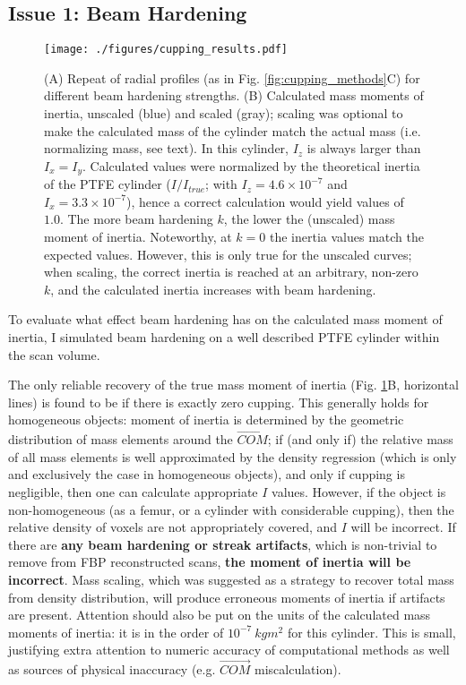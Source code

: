 \subsection{Issue 1: Beam Hardening}
\label{sec:orgdf2914b}

\begin{figure}[p]
\centering
\texttt{[image: ./figures/cupping\_results.pdf]}
\caption{\label{fig:cupping_results}  (A) Repeat of radial profiles (as in Fig. \ref{fig:cupping_methods}C) for different beam hardening strengths. (B) Calculated mass moments of inertia, unscaled (blue) and scaled (gray); scaling was optional to make the calculated mass of the cylinder match the actual mass (i.e. normalizing mass, see text). In this cylinder, \(I_z\) is always larger than \(I_x = I_y\). Calculated values were normalized by the theoretical inertia of the PTFE cylinder (\(I/I_{true}\); with \(I_z = 4.6\times10^{-7}\) and \(I_x = 3.3\times10^{-7}\)), hence a correct calculation would yield values of \(1.0\). The more beam hardening \(k\), the lower the (unscaled) mass moment of inertia. Noteworthy, at \(k=0\) the inertia values match the expected values. However, this is only true for the unscaled curves; when scaling, the correct inertia is reached at an arbitrary, non-zero \(k\), and the calculated inertia increases with beam hardening.}
\end{figure}



To evaluate what effect beam hardening has on the calculated mass moment of inertia, I simulated beam hardening on a well described PTFE cylinder within the scan volume.

The only reliable recovery of the true mass moment of inertia (Fig. \ref{fig:cupping_results}B, horizontal lines) is found to be if there is exactly zero cupping.
This generally holds for homogeneous objects: moment of inertia is determined by the geometric distribution of mass elements around the \(\vec{COM}\); if (and only if) the relative mass of all mass elements is well approximated by the density regression (which is only and exclusively the case in homogeneous objects), and only if cupping is negligible, then one can calculate appropriate \(I\) values.
However, if the object is non-homogeneous (as a femur, or a cylinder with considerable cupping), then the relative density of voxels are not appropriately covered, and \(I\) will be incorrect.
If there are \textbf{any beam hardening or streak artifacts}, which is non-trivial to remove from FBP reconstructed scans, \textbf{the moment of inertia will be incorrect}.
Mass scaling, which was suggested as a strategy to recover total mass from density distribution, will produce erroneous moments of inertia if artifacts are present.
Attention should also be put on the units of the calculated mass moments of inertia: it is in the order of \(10^{-7}\ kg m^2\) for this cylinder.
This is small, justifying extra attention to numeric accuracy of computational methods as well as sources of physical inaccuracy (e.g. \(\vec{COM}\) miscalculation).

